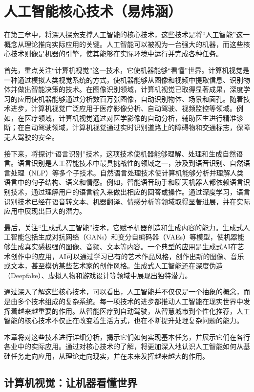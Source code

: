 \chapter{人工智能核心技术（易炜涵）}

在第三章中，将深入探索支撑人工智能的核心技术，这些技术是将“人工智能”这一概念从理论推向实际应用的关键。人工智能可以被视为一台强大的机器，而这些核心技术则像是机器的引擎，使其能够在实际环境中运行并完成各种任务。

首先，重点关注“计算机视觉”这一技术，它使机器能够“看懂”世界。计算机视觉是一种通过模拟人类视觉系统的方式，使机器能够从图像和视频中提取信息、识别物体并做出智能决策的技术。在图像识别领域，计算机视觉已取得显著成果，深度学习的应用使机器能够通过分析数百万张图像，自动识别物体、场景和面孔。随着技术进步，计算机视觉广泛应用于医疗影像分析、自动驾驶、视频监控等领域。例如，在医疗领域，计算机视觉通过对医学影像的自动分析，辅助医生进行精准诊断；在自动驾驶领域，计算机视觉通过实时识别道路上的障碍物和交通标志，保障无人驾驶的安全。

接下来，将探讨“语言识别”技术，这项技术使机器能够理解、处理和生成自然语言。语言识别是人工智能技术中最具挑战性的领域之一，涉及到语音识别、自然语言处理（NLP）等多个子技术。自然语言处理技术使计算机能够分析并理解人类语言中的句子结构、语义和情感。例如，智能语音助手和聊天机器人都依赖语言识别技术，通过理解用户的语言输入来做出相应的回答或操作。通过深度学习，语言识别技术已经在语音转文本、机器翻译、情感分析等领域取得显著进展，并在实际应用中展现出巨大的潜力。

最后，关注“生成式人工智能”技术，它赋予机器创造和生成内容的能力。生成式人工智能包括生成对抗网络（GANs）和变分自编码器（VAEs）等模型，使机器能够生成真实感极强的图像、音频、文本等内容。一个典型的应用是生成式AI在艺术创作中的应用，AI可以通过学习已有的艺术作品风格，创作出新的图像、音乐或文本，甚至模仿某些艺术家的创作风格。生成式人工智能还在深度伪造（Deepfake）、虚拟人物和游戏设计等领域中展现出独特潜力。

通过深入了解这些核心技术，可以看出，人工智能并不仅仅是一个抽象的概念，而是由多个技术组成的复杂系统。每一项技术的进步都推动人工智能在现实世界中发挥着越来越重要的作用。从智能医疗到自动驾驶，从智慧城市到个性化推荐，人工智能的核心技术不仅正在改变着生活方式，也在不断提升处理复杂问题的能力。

本章将对这些技术进行详细分析，揭示它们如何实现基本任务，并展示它们在各行各业中的实际应用。通过对核心技术的了解，将更加深入地认识人工智能如何从基础任务走向应用，从理论走向现实，并在未来发挥越来越大的作用。

\section{计算机视觉：让机器看懂世界}

